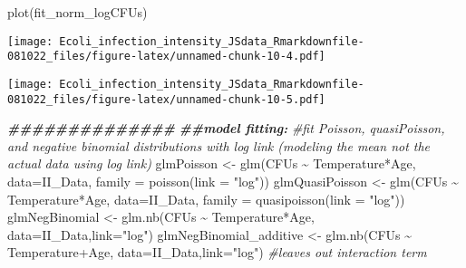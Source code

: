 \documentclass[
]{article}
\newenvironment{Shaded}{\begin{snugshade}}{\end{snugshade}}
\newcommand{\AttributeTok}[1]{\textcolor[rgb]{0.77,0.63,0.00}{#1}}
\newcommand{\CommentTok}[1]{\textcolor[rgb]{0.56,0.35,0.01}{\textit{#1}}}
\newcommand{\DocumentationTok}[1]{\textcolor[rgb]{0.56,0.35,0.01}{\textbf{\textit{#1}}}}
\newcommand{\FunctionTok}[1]{\textcolor[rgb]{0.00,0.00,0.00}{#1}}
\newcommand{\NormalTok}[1]{#1}
\newcommand{\OtherTok}[1]{\textcolor[rgb]{0.56,0.35,0.01}{#1}}
\newcommand{\SpecialCharTok}[1]{\textcolor[rgb]{0.00,0.00,0.00}{#1}}
\newcommand{\StringTok}[1]{\textcolor[rgb]{0.31,0.60,0.02}{#1}}
\begin{document}
\begin{Shaded}
\begin{Highlighting}[]
\FunctionTok{plot}\NormalTok{(fit\_norm\_logCFUs)}
\end{Highlighting}
\end{Shaded}

\texttt{[image: Ecoli\_infection\_intensity\_JSdata\_Rmarkdownfile-081022\_files/figure-latex/unnamed-chunk-10-4.pdf]}

\begin{Shaded}
\end{Shaded}

\texttt{[image: Ecoli\_infection\_intensity\_JSdata\_Rmarkdownfile-081022\_files/figure-latex/unnamed-chunk-10-5.pdf]}

\begin{Shaded}
\begin{Highlighting}[]
\DocumentationTok{\#\#\#\#\#\#\#\#\#\#\#\#\#\#}
\DocumentationTok{\#\#model fitting: }
\CommentTok{\#fit Poisson, quasiPoisson, and negative binomial distributions with log link (modeling the mean not the actual data using log link)}
\NormalTok{glmPoisson }\OtherTok{\textless{}{-}} \FunctionTok{glm}\NormalTok{(CFUs }\SpecialCharTok{\textasciitilde{}}\NormalTok{ Temperature}\SpecialCharTok{*}\NormalTok{Age, }\AttributeTok{data=}\NormalTok{II\_Data, }\AttributeTok{family =} \FunctionTok{poisson}\NormalTok{(}\AttributeTok{link =} \StringTok{"log"}\NormalTok{))}
\NormalTok{glmQuasiPoisson }\OtherTok{\textless{}{-}} \FunctionTok{glm}\NormalTok{(CFUs }\SpecialCharTok{\textasciitilde{}}\NormalTok{ Temperature}\SpecialCharTok{*}\NormalTok{Age, }\AttributeTok{data=}\NormalTok{II\_Data, }\AttributeTok{family =} \FunctionTok{quasipoisson}\NormalTok{(}\AttributeTok{link =} \StringTok{"log"}\NormalTok{))}
\NormalTok{glmNegBinomial }\OtherTok{\textless{}{-}} \FunctionTok{glm.nb}\NormalTok{(CFUs }\SpecialCharTok{\textasciitilde{}}\NormalTok{ Temperature}\SpecialCharTok{*}\NormalTok{Age, }\AttributeTok{data=}\NormalTok{II\_Data,}\AttributeTok{link=}\StringTok{"log"}\NormalTok{)}
\NormalTok{glmNegBinomial\_additive }\OtherTok{\textless{}{-}} \FunctionTok{glm.nb}\NormalTok{(CFUs }\SpecialCharTok{\textasciitilde{}}\NormalTok{ Temperature}\SpecialCharTok{+}\NormalTok{Age, }\AttributeTok{data=}\NormalTok{II\_Data,}\AttributeTok{link=}\StringTok{"log"}\NormalTok{) }\CommentTok{\#leaves out interaction term}
\end{Highlighting}
\end{Shaded}
\end{document}
